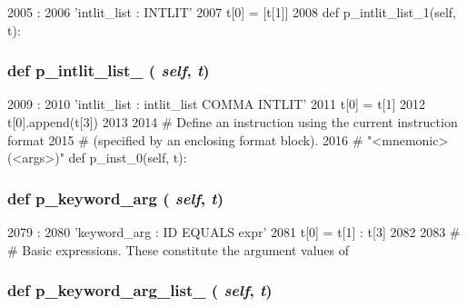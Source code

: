 \begin{DoxyCode}
2005                                 :
2006         'intlit_list : INTLIT'
2007         t[0] = [t[1]]
2008 
    def p_intlit_list_1(self, t):
\end{DoxyCode}
\hypertarget{classisa__parser_1_1ISAParser_a0e79a297e16a53adc6321ed5e30cc04a}{
\subsubsection[{p\_\-intlit\_\-list\_\-1}]{\setlength{\rightskip}{0pt plus 5cm}def p\_\-intlit\_\-list\_ ( {\em self}, \/   {\em t})}}
\label{classisa__parser_1_1ISAParser_a0e79a297e16a53adc6321ed5e30cc04a}



\begin{DoxyCode}
2009                                 :
2010         'intlit_list : intlit_list COMMA INTLIT'
2011         t[0] = t[1]
2012         t[0].append(t[3])
2013 
2014     # Define an instruction using the current instruction format
2015     # (specified by an enclosing format block).
2016     # "<mnemonic>(<args>)"
    def p_inst_0(self, t):
\end{DoxyCode}
\hypertarget{classisa__parser_1_1ISAParser_abfb5214c609bc972281bddd2bee0d8e6}{
\subsubsection[{p\_\-keyword\_\-arg}]{\setlength{\rightskip}{0pt plus 5cm}def p\_\-keyword\_\-arg ( {\em self}, \/   {\em t})}}
\label{classisa__parser_1_1ISAParser_abfb5214c609bc972281bddd2bee0d8e6}



\begin{DoxyCode}
2079                               :
2080         'keyword_arg : ID EQUALS expr'
2081         t[0] = { t[1] : t[3] }
2082 
2083     #
    # Basic expressions.  These constitute the argument values of
\end{DoxyCode}
\hypertarget{classisa__parser_1_1ISAParser_aa008a645d2cc21a46def4c82e8465149}{
\subsubsection[{p\_\-keyword\_\-arg\_\-list\_\-0}]{\setlength{\rightskip}{0pt plus 5cm}def p\_\-keyword\_\-arg\_\-list\_ ( {\em self}, \/   {\em t})}}
\label{classisa__parser_1_1ISAParser_aa008a645d2cc21a46def4c82e8465149}



